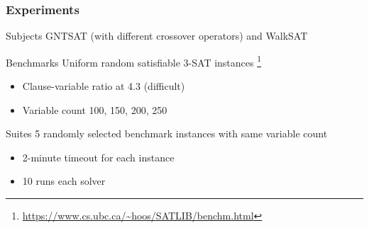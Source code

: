 \begin{frame}
\frametitle{Experiments}

\begin{block}{Subjects}
	GNTSAT (with different crossover operators) and WalkSAT
\end{block}

\begin{block}{Benchmarks}
	Uniform random satisfiable 3-SAT instances
	\footnote{\url{https://www.cs.ubc.ca/~hoos/SATLIB/benchm.html}}
	\begin{itemize}
		\item Clause-variable ratio at 4.3 (difficult) \parencite{biere2009handbook}
		\item Variable count 100, 150, 200, 250
	\end{itemize}
\end{block}

\begin{block}{Suites}
	5 randomly selected benchmark instances with same
	variable count
	\begin{itemize}
		\item 2-minute timeout for each instance
		\item 10 runs each solver 
	\end{itemize}
\end{block}
\end{frame}

